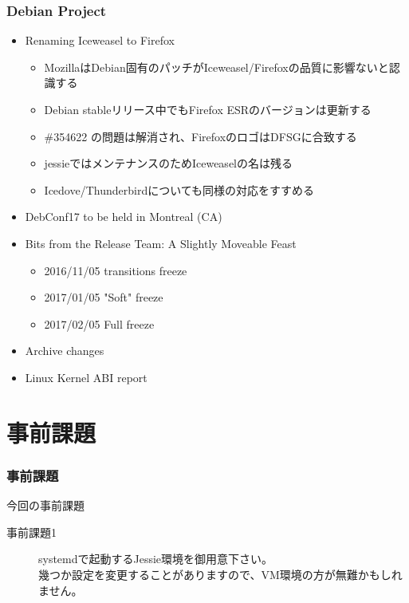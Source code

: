 \documentclass[cjk,dvipdfmx,10pt,compress,%
hyperref={bookmarks=true,bookmarksnumbered=true,bookmarksopen=false,%
colorlinks=false,%
pdftitle={第 108 回 関西 Debian 勉強会},%
pdfauthor={倉敷・のがた・佐々木・かわだ},%
pdfsubject={資料},%
}]{beamer}
\begin{document}
\begin{frame}[fragile]
  \frametitle{Debian Project}
  \begin{itemize}
  \item Renaming Iceweasel to Firefox
    \begin{itemize}
    \item MozillaはDebian固有のパッチがIceweasel/Firefoxの品質に影響ないと認識する
    \item Debian stableリリース中でもFirefox ESRのバージョンは更新する
    \item \#354622 の問題は解消され、FirefoxのロゴはDFSGに合致する
    \item jessieではメンテナンスのためIceweaselの名は残る
    \item Icedove/Thunderbirdについても同様の対応をすすめる
    \end{itemize}
  \item DebConf17 to be held in Montreal (CA)
  \item Bits from the Release Team: A Slightly Moveable Feast
    \begin{itemize}
    \item 2016/11/05 transitions freeze
    \item 2017/01/05 "Soft" freeze
    \item 2017/02/05 Full freeze
    \end{itemize}
  \item Archive changes
  \item Linux Kernel ABI report
  \end{itemize}
\end{frame}


\section{事前課題}

\begin{frame}[fragile]
  \frametitle{事前課題}
  \begin{block}{今回の事前課題}
    \begin{description}
    \item[事前課題1] systemdで起動するJessie環境を御用意下さい。\\
      幾つか設定を変更することがありますので、VM環境の方が無難かもしれません。
    \end{description}
  \end{block}
\end{frame}
\end{document}
